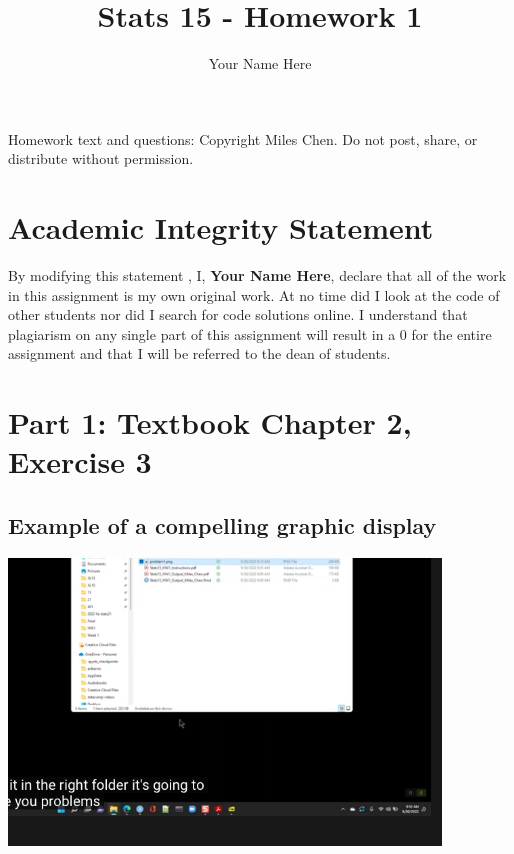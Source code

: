 \documentclass[
]{article}
\title{Stats 15 - Homework 1}
\author{Your Name Here}
\date{}
\begin{document}
\maketitle

Homework text and questions: Copyright Miles Chen. Do not post, share,
or distribute without permission.

\hypertarget{academic-integrity-statement}{%
\section{Academic Integrity
Statement}\label{academic-integrity-statement}}

By modifying this statement , I, \textbf{Your Name Here}, declare that
all of the work in this assignment is my own original work. At no time
did I look at the code of other students nor did I search for code
solutions online. I understand that plagiarism on any single part of
this assignment will result in a 0 for the entire assignment and that I
will be referred to the dean of students.

\hypertarget{part-1-textbook-chapter-2-exercise-3}{%
\section{Part 1: Textbook Chapter 2, Exercise
3}\label{part-1-textbook-chapter-2-exercise-3}}

\hypertarget{example-of-a-compelling-graphic-display}{%
\subsection{Example of a compelling graphic
display}\label{example-of-a-compelling-graphic-display}}

\includegraphics[height=3in]{problem1}
\end{document}

